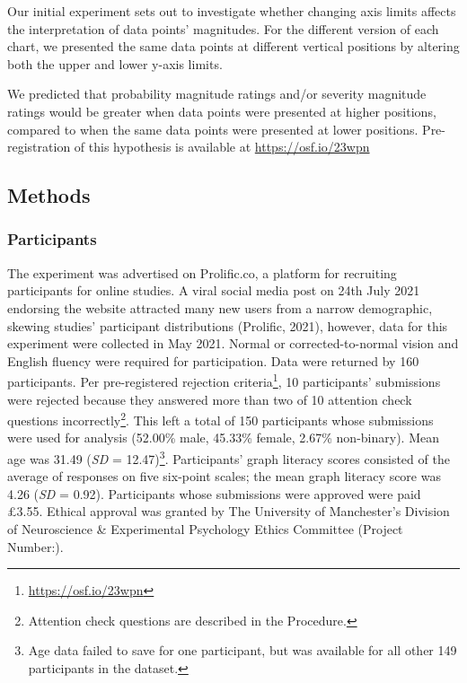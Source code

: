 \documentclass[journal]{vgtc}                %
\begin{document}
Our initial experiment sets out to investigate whether changing axis limits affects the interpretation of data points' magnitudes. For the different version of each chart, we presented the same data points at different vertical positions by altering both the upper and lower y-axis limits.

We predicted that probability magnitude ratings and/or severity magnitude ratings would be greater when data points were presented at higher positions, compared to when the same data points were presented at lower positions. Pre-registration of this hypothesis is available at \url{https://osf.io/23wpn}

\hypertarget{methods}{%
\subsection{Methods}\label{methods}}

\hypertarget{participants}{%
\subsubsection{Participants}\label{participants}}

The experiment was advertised on Prolific.co, a platform for recruiting participants for online studies. A viral social media post on 24th July 2021 endorsing the website attracted many new users from a narrow demographic, skewing studies' participant distributions (Prolific, 2021), however, data for this experiment were collected in May 2021. Normal or corrected-to-normal vision and English fluency were required for participation. Data were returned by 160 participants. Per pre-registered rejection criteria\footnote{\url{https://osf.io/23wpn}}, 10 participants' submissions were rejected because they answered more than two of 10 attention check questions incorrectly\footnote{Attention check questions are described in the Procedure.}. This left a total of 150 participants whose submissions were used for analysis (52.00\% male, 45.33\% female, 2.67\% non-binary). Mean age was 31.49 (\emph{SD} = 12.47)\footnote{Age data failed to save for one participant, but was available for all other 149 participants in the dataset.}. Participants' graph literacy scores consisted of the average of responses on five six-point scales; the mean graph literacy score was 4.26 (\emph{SD} = 0.92). Participants whose submissions were approved were paid £3.55. Ethical approval was granted by The University of Manchester's Division of Neuroscience \& Experimental Psychology Ethics Committee (Project Number:).
\end{document}
